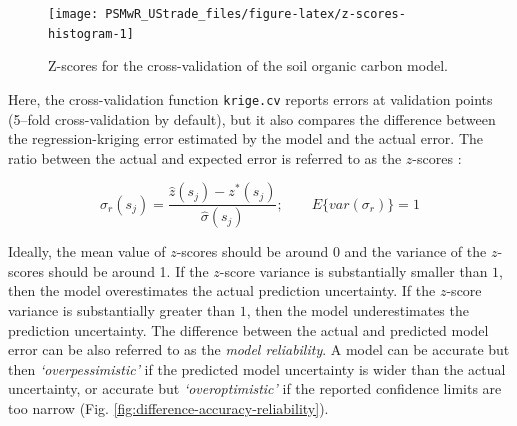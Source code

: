 \documentclass[graybox,natbib,nospthms,UStrade]{svmono}
\newenvironment{Shaded}{\begin{snugshade}}{\end{snugshade}}
\newcommand{\DataTypeTok}[1]{\textcolor[rgb]{0.27,0.27,0.27}{#1}}
\newcommand{\DecValTok}[1]{\textcolor[rgb]{0.06,0.06,0.06}{#1}}
\newcommand{\KeywordTok}[1]{\textcolor[rgb]{0.27,0.27,0.27}{\textbf{#1}}}
\newcommand{\NormalTok}[1]{#1}
\newcommand{\OperatorTok}[1]{\textcolor[rgb]{0.43,0.43,0.43}{\textbf{#1}}}
\newcommand{\StringTok}[1]{\textcolor[rgb]{0.5,0.5,0.5}{#1}}
\begin{document}
\begin{Shaded}
\end{Shaded}

\begin{figure}[H]

{\centering \texttt{[image: PSMwR\_UStrade\_files/figure-latex/z-scores-histogram-1]} 

}

\caption{Z-scores for the cross-validation of the soil organic carbon model.}\label{fig:z-scores-histogram}
\end{figure}

Here, the cross-validation function \texttt{krige.cv} reports errors at
validation points (5--fold cross-validation by default), but it also
compares the difference between the regression-kriging error estimated by
the model and the actual error. The ratio between the actual and
expected error is referred to as the \(z\)-scores \citep[ p.225]{Bivand2008Springer}:

\begin{equation}
 \sigma_r ({{s}}_j) = \frac{\hat z({{s}}_j ) - z^* ({{s}}_j )}{\hat{\sigma}({{s}}_j )}; \qquad  E\{var(\sigma_r)\} = 1
\label{eq:z-scores}
\end{equation}

Ideally, the mean value of \(z\)-scores should be around 0 and
the variance of the \(z\)-scores should be around 1. If the \(z\)-score variance
is substantially smaller than \(1\), then the model overestimates the
actual prediction uncertainty. If the \(z\)-score variance is substantially
greater than \(1\), then the model underestimates the prediction uncertainty.
The difference between the actual and predicted model error can be also
referred to as the \emph{model reliability}. A model can be accurate but then
\emph{`overpessimistic'} if the predicted model uncertainty is wider than the
actual uncertainty, or accurate but \emph{`overoptimistic'} if the reported
confidence limits are too narrow
(Fig. \ref{fig:difference-accuracy-reliability}).
\end{document}
